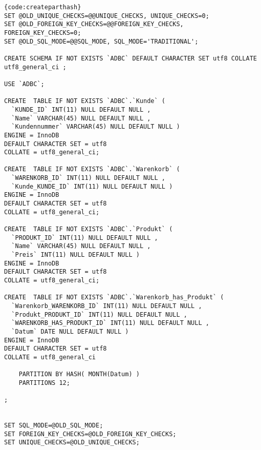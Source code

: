 \begin{lstlisting}[caption=Tabellenerzeugung mit Hash-Partitioning, firstnumber=1]{code:createparthash}
SET @OLD_UNIQUE_CHECKS=@@UNIQUE_CHECKS, UNIQUE_CHECKS=0;
SET @OLD_FOREIGN_KEY_CHECKS=@@FOREIGN_KEY_CHECKS, FOREIGN_KEY_CHECKS=0;
SET @OLD_SQL_MODE=@@SQL_MODE, SQL_MODE='TRADITIONAL';

CREATE SCHEMA IF NOT EXISTS `ADBC` DEFAULT CHARACTER SET utf8 COLLATE utf8_general_ci ;

USE `ADBC`;

CREATE  TABLE IF NOT EXISTS `ADBC`.`Kunde` (
  `KUNDE_ID` INT(11) NULL DEFAULT NULL ,
  `Name` VARCHAR(45) NULL DEFAULT NULL ,
  `Kundennummer` VARCHAR(45) NULL DEFAULT NULL )
ENGINE = InnoDB
DEFAULT CHARACTER SET = utf8
COLLATE = utf8_general_ci;

CREATE  TABLE IF NOT EXISTS `ADBC`.`Warenkorb` (
  `WARENKORB_ID` INT(11) NULL DEFAULT NULL ,
  `Kunde_KUNDE_ID` INT(11) NULL DEFAULT NULL )
ENGINE = InnoDB
DEFAULT CHARACTER SET = utf8
COLLATE = utf8_general_ci;

CREATE  TABLE IF NOT EXISTS `ADBC`.`Produkt` (
  `PRODUKT_ID` INT(11) NULL DEFAULT NULL ,
  `Name` VARCHAR(45) NULL DEFAULT NULL ,
  `Preis` INT(11) NULL DEFAULT NULL )
ENGINE = InnoDB
DEFAULT CHARACTER SET = utf8
COLLATE = utf8_general_ci;

CREATE  TABLE IF NOT EXISTS `ADBC`.`Warenkorb_has_Produkt` (
  `Warenkorb_WARENKORB_ID` INT(11) NULL DEFAULT NULL ,
  `Produkt_PRODUKT_ID` INT(11) NULL DEFAULT NULL ,
  `WARENKORB_HAS_PRODUKT_ID` INT(11) NULL DEFAULT NULL ,
  `Datum` DATE NULL DEFAULT NULL )
ENGINE = InnoDB
DEFAULT CHARACTER SET = utf8
COLLATE = utf8_general_ci

    PARTITION BY HASH( MONTH(Datum) )
    PARTITIONS 12;

;


SET SQL_MODE=@OLD_SQL_MODE;
SET FOREIGN_KEY_CHECKS=@OLD_FOREIGN_KEY_CHECKS;
SET UNIQUE_CHECKS=@OLD_UNIQUE_CHECKS;
\end{lstlisting}

